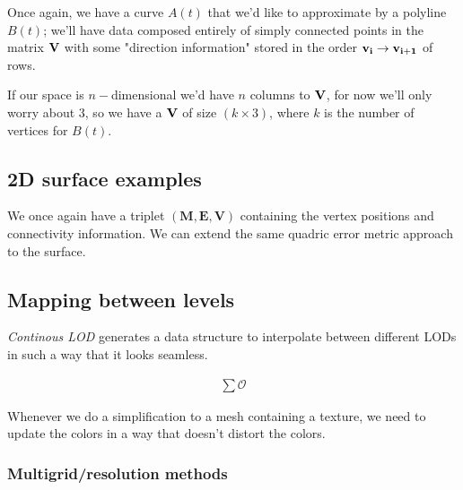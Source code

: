 Once again, we have a curve $A(t)$ that we'd like to approximate
by a polyline $B(t)$; we'll have data composed entirely of simply connected
points in the matrix $\bf{V}$ with some "direction information" 
stored in the order $\bf{v_i\rightarrow v_{i+1}}$ of rows.

\spa

If our space is $n-$dimensional we'd have $n$ columns to 
$\bf{V}$, for now we'll only worry about 3, so we have a
$\bf{V}$ of size $(k \times 3)$, where $k$ is the number of
vertices for $B(t)$.



\subsection{2D surface examples}

We once again have a triplet $(\mathbf{M,E,V})$
containing the vertex positions and connectivity
information. We can extend the same quadric
error metric approach to the surface.


\subsection{Mapping between levels}

\emph{Continous LOD} generates a data structure 
to interpolate between different LODs in such a way
that it looks seamless. 

\begin{align}
    \sum \mathcal{O}
\end{align}

Whenever we do a simplification to a mesh
containing a texture, we need to update the
colors in a way that doesn't distort the colors.

\subsubsection{Multigrid/resolution methods}


